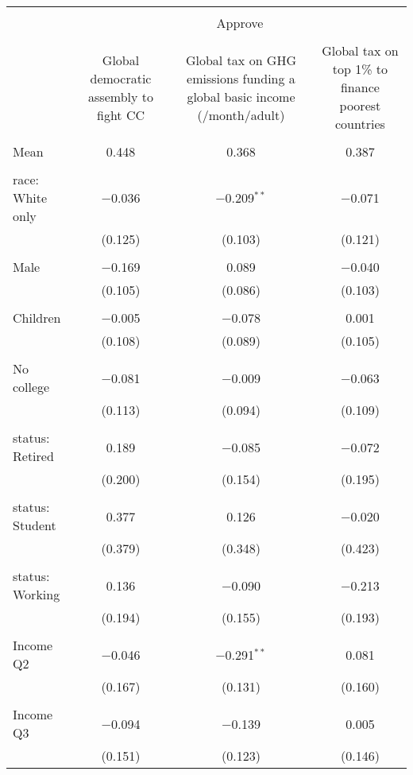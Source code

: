 
\begin{tabular}{@{\extracolsep{5pt}}lccc} 
\\[-1.8ex]\hline 
\hline \\[-1.8ex] 
 & \multicolumn{3}{c}{Approve} \\ 
\cline{2-4} 
\\[-1.8ex] & Global democratic assembly to fight CC & Global tax on GHG emissions funding a global basic income (\textdollar 30/month/adult) & Global tax on top 1\% to finance poorest countries \\ 
\hline \\[-1.8ex] 
 Mean & 0.448 & 0.368 & 0.387  \\ \hline \\[-1.8ex] race: White only & $-$0.036 & $-$0.209$^{**}$ & $-$0.071 \\ 
  & (0.125) & (0.103) & (0.121) \\ 
  & & & \\ 
 Male & $-$0.169 & 0.089 & $-$0.040 \\ 
  & (0.105) & (0.086) & (0.103) \\ 
  & & & \\ 
 Children & $-$0.005 & $-$0.078 & 0.001 \\ 
  & (0.108) & (0.089) & (0.105) \\ 
  & & & \\ 
 No college & $-$0.081 & $-$0.009 & $-$0.063 \\ 
  & (0.113) & (0.094) & (0.109) \\ 
  & & & \\ 
 status: Retired & 0.189 & $-$0.085 & $-$0.072 \\ 
  & (0.200) & (0.154) & (0.195) \\ 
  & & & \\ 
 status: Student & 0.377 & 0.126 & $-$0.020 \\ 
  & (0.379) & (0.348) & (0.423) \\ 
  & & & \\ 
 status: Working & 0.136 & $-$0.090 & $-$0.213 \\ 
  & (0.194) & (0.155) & (0.193) \\ 
  & & & \\ 
 Income Q2 & $-$0.046 & $-$0.291$^{**}$ & 0.081 \\ 
  & (0.167) & (0.131) & (0.160) \\ 
  & & & \\ 
 Income Q3 & $-$0.094 & $-$0.139 & 0.005 \\ 
  & (0.151) & (0.123) & (0.146) \\ 

\end{tabular}
